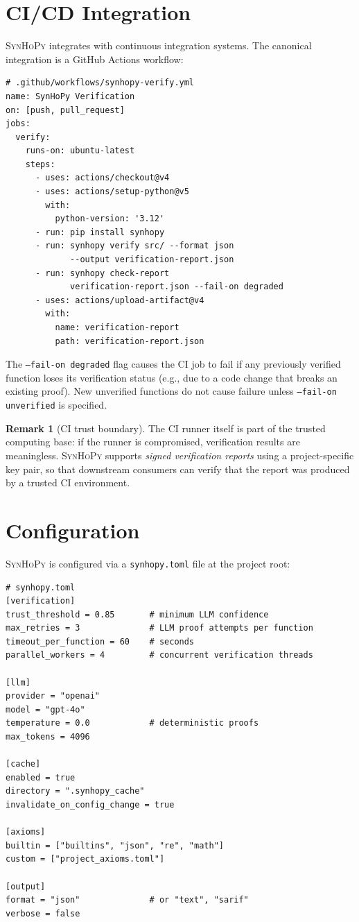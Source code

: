 \documentclass[11pt,a4paper]{report}
\theoremstyle{definition}
\newtheorem{remark}[definition]{Remark}
\theoremstyle{plain}
\newcommand{\synhopy}{\textsc{SynHoPy}}
\begin{document}
\section{CI/CD Integration}

\synhopy{} integrates with continuous integration systems.  The canonical
integration is a GitHub Actions workflow:

\begin{lstlisting}[style=python]
# .github/workflows/synhopy-verify.yml
name: SynHoPy Verification
on: [push, pull_request]
jobs:
  verify:
    runs-on: ubuntu-latest
    steps:
      - uses: actions/checkout@v4
      - uses: actions/setup-python@v5
        with:
          python-version: '3.12'
      - run: pip install synhopy
      - run: synhopy verify src/ --format json
             --output verification-report.json
      - run: synhopy check-report
             verification-report.json --fail-on degraded
      - uses: actions/upload-artifact@v4
        with:
          name: verification-report
          path: verification-report.json
\end{lstlisting}

The \texttt{--fail-on degraded} flag causes the CI job to fail if any
previously verified function loses its verification status (e.g., due to
a code change that breaks an existing proof).  New unverified functions
do not cause failure unless \texttt{--fail-on unverified} is specified.

\begin{remark}[CI trust boundary]
The CI runner itself is part of the trusted computing base: if the runner
is compromised, verification results are meaningless.  \synhopy{} supports
\emph{signed verification reports} using a project-specific key pair, so
that downstream consumers can verify that the report was produced by a
trusted CI environment.
\end{remark}

\section{Configuration}

\synhopy{} is configured via a \texttt{synhopy.toml} file at the project root:

\begin{lstlisting}[style=python]
# synhopy.toml
[verification]
trust_threshold = 0.85       # minimum LLM confidence
max_retries = 3              # LLM proof attempts per function
timeout_per_function = 60    # seconds
parallel_workers = 4         # concurrent verification threads

[llm]
provider = "openai"
model = "gpt-4o"
temperature = 0.0            # deterministic proofs
max_tokens = 4096

[cache]
enabled = true
directory = ".synhopy_cache"
invalidate_on_config_change = true

[axioms]
builtin = ["builtins", "json", "re", "math"]
custom = ["project_axioms.toml"]

[output]
format = "json"              # or "text", "sarif"
verbose = false
\end{lstlisting}
\end{document}
